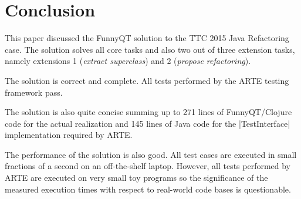 \documentclass[submission]{eptcs}
\newcommand{\code}{\clojureinline}
\begin{document}
\section{Conclusion}
\label{sec:conclusion}

This paper discussed the FunnyQT solution to the TTC 2015 Java Refactoring
case.  The solution solves all core tasks and also two out of three extension
tasks, namely extensions 1 (\emph{extract superclass}) and 2 (\emph{propose
  refactoring}).

The solution is correct and complete.  All tests performed by the ARTE testing
framework pass.

The solution is also quite concise summing up to 271 lines of FunnyQT/Clojure
code for the actual realization and 145 lines of Java code for the
\code|TestInterface| implementation required by ARTE.

The performance of the solution is also good.  All test cases are executed in
small fractions of a second on an off-the-shelf laptop.  However, all tests
performed by ARTE are executed on very small toy programs so the significance
of the measured execution times with respect to real-world code bases is
questionable.



\end{document}
